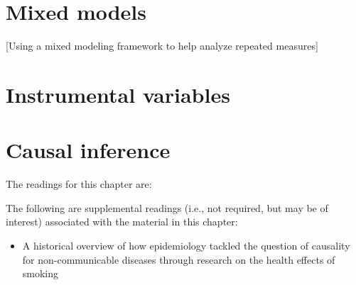 \documentclass[
]{book}
\providecommand{\tightlist}{%
  \setlength{\itemsep}{0pt}\setlength{\parskip}{0pt}}
\begin{document}
\hypertarget{mixed-models}{%
\chapter{Mixed models}\label{mixed-models}}

{[}Using a mixed modeling framework to help analyze repeated measures{]}

\hypertarget{instrumental-variables}{%
\chapter{Instrumental variables}\label{instrumental-variables}}

\hypertarget{causal-inference}{%
\chapter{Causal inference}\label{causal-inference}}

The readings for this chapter are:

The following are supplemental readings (i.e., not required, but may be of
interest) associated with the material in this chapter:

\begin{itemize}
\tightlist
\item
  \citet{samet2016epidemiology} A historical overview of how epidemiology tackled the question of causality for non-communicable diseases through research on the health effects of smoking
\end{itemize}

  
\end{document}
